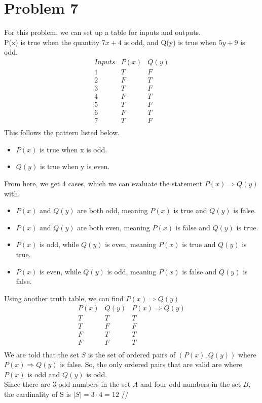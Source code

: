 \documentclass[11pt]{article}
\begin{document}
\section*{Problem 7}
For this problem, we can set up a table for inputs and outputs.\\
P(x) is true when the quantity $7x+4$ is odd, and Q(y) is true when $5y+9$ is odd.
\begin{displaymath}
\begin{array}{c|c|c}
    Inputs & P(x) & Q(y)\\
    \hline
    1 & T & F \\
    2 & F & T \\
    3 & T & F \\
    4 & F & T \\
    5 & T & F \\
    6 & F & T \\
    7 & T & F \\
\end{array}
\end{displaymath}
This follows the pattern listed below.
\begin{itemize}
    \item $P(x)$ is true when x is odd.
    \item $Q(y)$ is true when y is even.
\end{itemize}
From here, we get 4 cases, which we can evaluate the statement $P(x) \Rightarrow Q(y)$ with.
\begin{itemize}
    \item $P(x)$ and $Q(y)$ are both odd, meaning $P(x)$ is true and $Q(y)$ is false.
    \item $P(x)$ and $Q(y)$ are both even, meaning $P(x)$ is false and $Q(y)$ is true.
    \item $P(x)$ is odd, while $Q(y)$ is even, meaning $P(x)$ is true and $Q(y)$ is true.
    \item $P(x)$ is even, while $Q(y)$ is odd, meaning $P(x)$ is false and $Q(y)$ is false.
\end{itemize}
Using another truth table, we can find $P(x) \Rightarrow Q(y)$
\begin{displaymath}
\begin{array}{c|c|c}
    P(x) & Q(y) & P(x) \Rightarrow Q(y)\\
    \hline
    T & T & T\\
    T & F & F\\
    F & T & T\\
    F & F & T\\
\end{array}
\end{displaymath}
We are told that the set $S$ is the set of ordered pairs of $(P(x), Q(y))$ where $P(x) \Rightarrow Q(y)$ is false. So, the only ordered pairs that are valid are where $P(x)$ is odd and $Q(y)$ is odd.\\
Since there are 3 odd numbers in the set $A$ and four odd numbers in the set $B$, the cardinality of S is $|S| = 3 \cdot 4 = 12$ //\\
\end{document}
